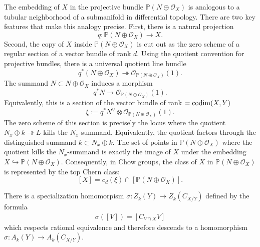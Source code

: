 \documentclass[12pt]{article}
\begin{document}
\begin{remark}
    The embedding of \(X\) in the projective bundle \(\mathbb P(N\oplus \mathcal O_X)\) is analogous to a tubular neighborhood of a submanifold in differential topology. There are two key features that make this analogy precise.
    First, there is a natural projection
    \[
        q:\mathbb P(N\oplus \mathcal O_X)\to X.
    \]
    Second, the copy of \(X\) inside \(\mathbb P(N\oplus \mathcal O_X)\) is cut
    out as the zero scheme of a regular section of a vector bundle of rank
    \(d\). Using the quotient convention for projective bundles, there is a
    universal quotient line bundle
    \[
        q^*(N\oplus \mathcal O_X)
        \twoheadrightarrow
        \mathcal O_{\mathbb P(N\oplus \mathcal O_X)}(1).
    \]
    The summand \(N\subset N\oplus \mathcal O_X\) induces a morphism
    \[
        q^*N
        \longrightarrow
        \mathcal O_{\mathbb P(N\oplus \mathcal O_X)}(1).
    \]
    Equivalently, this is a section of the vector bundle of rank $= \operatorname{codim}(X,Y)$
    \[
        \xi
        :=
        q^*N^\vee\otimes
        \mathcal O_{\mathbb P(N\oplus \mathcal O_X)}(1).
    \]
    The zero scheme of this section is precisely the locus where the quotient $N_x\oplus k\twoheadrightarrow L$
    kills the \(N_x\)-summand. Equivalently, the quotient factors through the
    distinguished summand $k\subset N_x\oplus k$.
    The set of points in \(\mathbb P(N\oplus \mathcal O_X)\) where the quotient
    kills the \(N_x\)-summand is exactly the image of $X$ under the embedding $X\hookrightarrow \mathbb P(N\oplus \mathcal O_X)$.
    Consequently, in Chow groups, the class of \(X\) in
    \(\mathbb P(N\oplus \mathcal O_X)\) is represented by the top Chern class:
    \[
        [X]
        =
        c_d(\xi)
        \cap
        [\mathbb P(N\oplus \mathcal O_X)].
    \]
\end{remark}
There is a specialization homomorpism $\sigma: Z_k(Y)\to Z_k(C_{X/Y})$ defined by the formula \begin{align*}
    \sigma([V])
    =
    [C_{V\cap X}V]
\end{align*} which respects rational equivalence and therefore descends to a homomorphism $\sigma: A_k(Y)\to A_k(C_{X/Y})$. 
\end{document}
